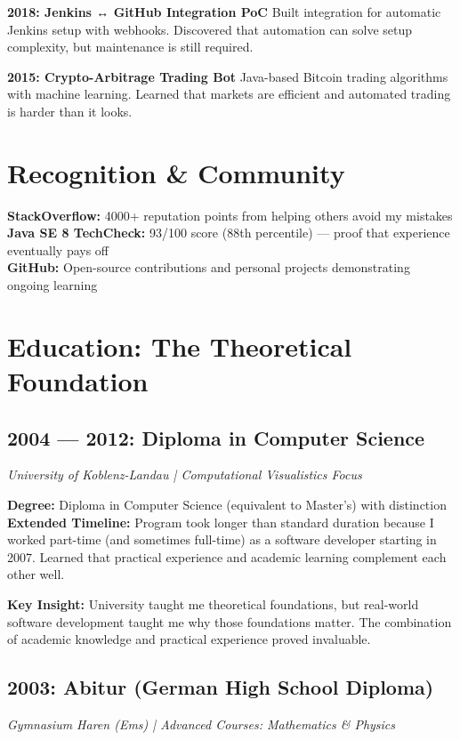 \documentclass[11pt,a4paper]{article}
\begin{document}
\textbf{2018: Jenkins ↔ GitHub Integration PoC}
Built integration for automatic Jenkins setup with webhooks. Discovered that automation can solve setup complexity, but maintenance is still required.

\textbf{2015: Crypto-Arbitrage Trading Bot}
Java-based Bitcoin trading algorithms with machine learning. Learned that markets are efficient and automated trading is harder than it looks.

\vspace{0.5em}

\section*{Recognition \& Community}

\textbf{StackOverflow:} 4000+ reputation points from helping others avoid my mistakes\\
\textbf{Java SE 8 TechCheck:} 93/100 score (88th percentile) --- proof that experience eventually pays off\\
\textbf{GitHub:} Open-source contributions and personal projects demonstrating ongoing learning

\newpage

\section*{Education: The Theoretical Foundation}

\subsection*{2004 --- 2012: Diploma in Computer Science}
\textit{University of Koblenz-Landau | Computational Visualistics Focus}

\textbf{Degree:} Diploma in Computer Science (equivalent to Master's) with distinction\\
\textbf{Extended Timeline:} Program took longer than standard duration because I worked part-time (and sometimes full-time) as a software developer starting in 2007. Learned that practical experience and academic learning complement each other well.

\textbf{Key Insight:} University taught me theoretical foundations, but real-world software development taught me why those foundations matter. The combination of academic knowledge and practical experience proved invaluable.

\subsection*{2003: Abitur (German High School Diploma)}
\textit{Gymnasium Haren (Ems) | Advanced Courses: Mathematics \& Physics}
\end{document}
